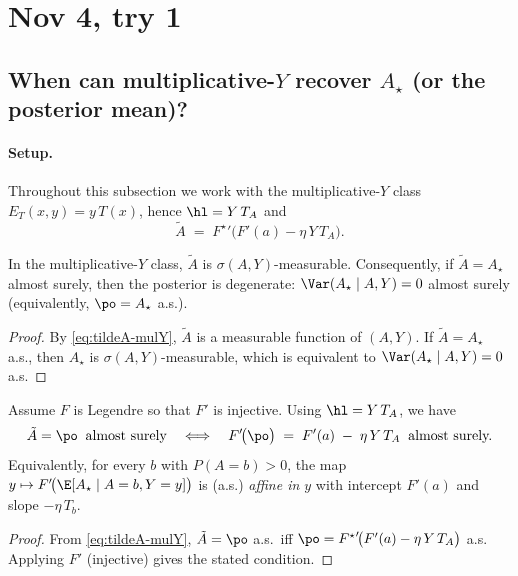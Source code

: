 \section{Nov 4, try 1}
\subsection{When can multiplicative-\texorpdfstring{$Y$}{Y} recover \texorpdfstring{$A_\star$}{A\_star} (or the posterior mean)?}

\paragraph{Setup.}
Throughout this subsection we work with the multiplicative-$Y$ class
$E_T(x,y)=y\,T(x)$, hence $\hl=Y\,T_A$ and
\begin{equation}
    \tilde{A} \;=\; {F^\star}'\!\big(F'(a)-\eta\,Y\,T_A\big).
    \label{eq:tildeA-mulY}
\end{equation}

\begin{lemma}\label{lem:measurability}
    In the multiplicative-$Y$ class, $\tilde{A}$ is $\sigma(A,Y)$-measurable.
    Consequently, if $\tilde{A}=A_\star$ almost surely, then the posterior is
    degenerate: $\Var(A_\star\mid A,Y)=0$ almost surely (equivalently,
    $\po=A_\star$ a.s.).
\end{lemma}

\begin{proof}
    By \eqref{eq:tildeA-mulY}, $\tilde{A}$ is a measurable function of $(A,Y)$.
    If $\tilde{A}=A_\star$ a.s., then $A_\star$ is $\sigma(A,Y)$-measurable,
    which is equivalent to $\Var(A_\star\mid A,Y)=0$ a.s.
\end{proof}

\begin{proposition}[Characterization: $\tilde{A}=\po$ a.s. in the multiplicative-$Y$ class]
    \label{prop:mulY-po-iff}
    Assume $F$ is Legendre so that $F'$ is injective. Using $\hl=Y\,T_A$, we have
    \[
        \tilde{A}=\po \;\; \text{almost surely}
        \quad\Longleftrightarrow\quad
        F'\!\big(\po\big) \;=\; F'(a)\;-\;\eta\,Y\,T_A \;\; \text{almost surely.}
    \]
    Equivalently, for every $b$ with $P(A=b)>0$, the map
    $y\mapsto F'\!\big(\E[A_\star\mid A=b,Y=y]\big)$ is (a.s.) \emph{affine in $y$}
    with intercept $F'(a)$ and slope $-\eta\,T_b$.
\end{proposition}

\begin{proof}
    From \eqref{eq:tildeA-mulY}, $\tilde{A}=\po$ a.s.\ iff
    \(
    \po={F^\star}'\!\big(F'(a)-\eta\,Y\,T_A\big)
    \)
    a.s. Applying $F'$ (injective) gives the stated condition.
\end{proof}

